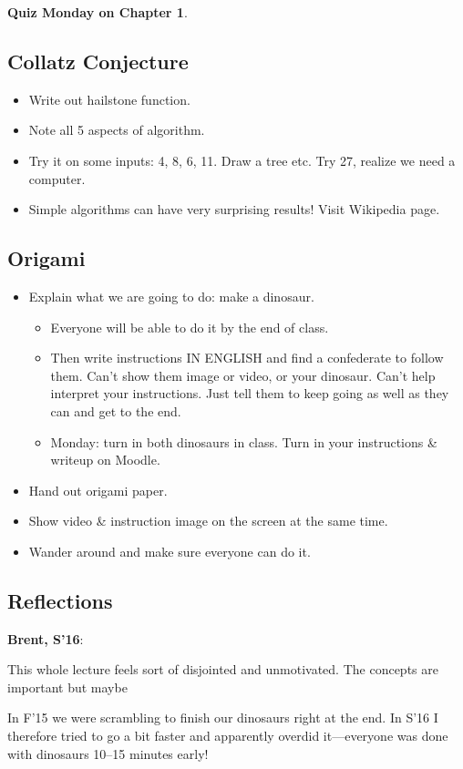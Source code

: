 \documentclass{article}
\newenvironment{reflect}[1]
{
  \begin{lrbox}{\reflectbox}
    \begin{minipage}[t]{\textwidth}
      \textbf{#1}:
}{
    \end{minipage}
  \end{lrbox}
  \fbox{\usebox{\reflectbox}}
}
\begin{document}
\textbf{Quiz Monday on Chapter 1}.

\subsection*{Collatz Conjecture}

\begin{itemize}
\item Write out hailstone function.
\item Note all 5 aspects of algorithm.
\item Try it on some inputs: 4, 8, 6, 11. Draw a tree etc.  Try 27,
  realize we need a computer.
\item Simple algorithms can have very surprising results!  Visit
  Wikipedia page.
\end{itemize}

\subsection*{Origami}

\begin{itemize}
\item Explain what we are going to do: make a dinosaur.
  \begin{itemize}
  \item Everyone will be able to do it by the end of class.
  \item Then write instructions IN ENGLISH and find a confederate to
    follow them.  Can't show them image or video, or your dinosaur.
    Can't help interpret your instructions.  Just tell them to keep
    going as well as they can and get to the end.
  \item Monday: turn in both dinosaurs in class.  Turn in your
    instructions \& writeup on Moodle.
  \end{itemize}

\item Hand out origami paper.
\item Show video \& instruction image on the screen at the same time.
\item Wander around and make sure everyone can do it.
\end{itemize}

\subsection*{Reflections}

\begin{reflect}{Brent, S'16}
  This whole lecture feels sort of disjointed and unmotivated.  The
  concepts are important but maybe

  In F'15 we were scrambling to finish our dinosaurs right at the end.
  In S'16 I therefore tried to go a bit faster and apparently overdid
  it---everyone was done with dinosaurs 10--15 minutes early!
\end{reflect}
\end{document}
